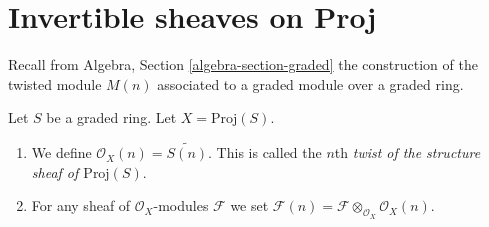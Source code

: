 \section{Invertible sheaves on Proj}
\label{section-invertible-on-proj}

\noindent
Recall from Algebra, Section \ref{algebra-section-graded}
the construction of the twisted module $M(n)$ associated
to a graded module over a graded ring.

\begin{definition}
\label{definition-twist}
Let $S$ be a graded ring. Let $X = \text{Proj}(S)$.
\begin{enumerate}
\item We define $\mathcal{O}_X(n) = \widetilde{S(n)}$.
This is called the $n$th
{\it twist of the structure sheaf of $\text{Proj}(S)$}.
\item For any sheaf of $\mathcal{O}_X$-modules $\mathcal{F}$ we set
$\mathcal{F}(n) = \mathcal{F} \otimes_{\mathcal{O}_X} \mathcal{O}_X(n)$.
\end{enumerate}
\end{definition}

